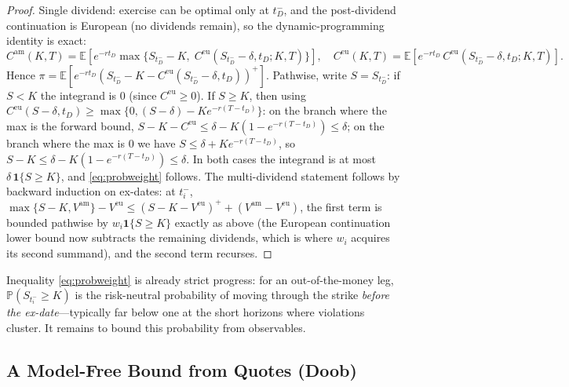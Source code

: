 \documentclass[11pt]{article}
\theoremstyle{remark}
\newcommand{\Cam}{C^{\mathrm{am}}}
\newcommand{\Ceu}{C^{\mathrm{eu}}}
\newcommand{\E}{\mathbb{E}}
\newcommand{\Prob}{\mathbb{P}}
\begin{document}
\begin{proof}
Single dividend: exercise can be optimal only at $t_D^-$, and the post-dividend continuation is European (no dividends remain), so the dynamic-programming identity is exact:
\[
\Cam(K,T)=\E\!\left[e^{-rt_D}\max\!\big\{S_{t_D^-}-K,\;\Ceu(S_{t_D^-}-\delta,t_D;K,T)\big\}\right],\quad
\Ceu(K,T)=\E\!\left[e^{-rt_D}\,\Ceu(S_{t_D^-}-\delta,t_D;K,T)\right].
\]
Hence $\pi=\E[e^{-rt_D}(S_{t_D^-}-K-\Ceu(S_{t_D^-}-\delta,t_D))^+]$. Pathwise, write $S=S_{t_D^-}$: if $S<K$ the integrand is $0$ (since $\Ceu\ge0$). If $S\ge K$, then using $\Ceu(S-\delta,t_D)\ge\max\{0,(S-\delta)-Ke^{-r(T-t_D)}\}$: on the branch where the max is the forward bound, $S-K-\Ceu\le \delta-K(1-e^{-r(T-t_D)})\le\delta$; on the branch where the max is $0$ we have $S\le \delta+Ke^{-r(T-t_D)}$, so $S-K\le\delta-K(1-e^{-r(T-t_D)})\le\delta$. In both cases the integrand is at most $\delta\,\mathbf 1\{S\ge K\}$, and \eqref{eq:probweight} follows. The multi-dividend statement follows by backward induction on ex-dates: at $t_i^-$, $\max\{S-K,V^{\mathrm{am}}\}-V^{\mathrm{eu}}\le (S-K-V^{\mathrm{eu}})^++(V^{\mathrm{am}}-V^{\mathrm{eu}})$, the first term is bounded pathwise by $w_i\mathbf 1\{S\ge K\}$ exactly as above (the European continuation lower bound now subtracts the remaining dividends, which is where $w_i$ acquires its second summand), and the second term recurses.
\end{proof}

Inequality \eqref{eq:probweight} is already strict progress: for an out-of-the-money leg, $\Prob(S_{t_i^-}\ge K)$ is the risk-neutral probability of moving through the strike \emph{before the ex-date}---typically far below one at the short horizons where violations cluster. It remains to bound this probability from observables.

\subsection{A Model-Free Bound from Quotes (Doob)}
\end{document}
